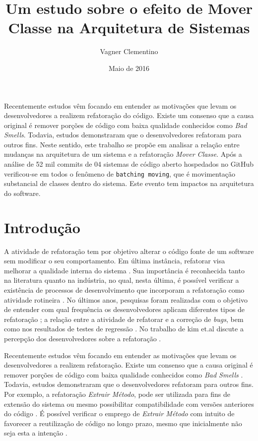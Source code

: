 \documentclass[12pt]{article}
\title{Um estudo sobre o efeito de Mover Classe na Arquitetura de Sistemas}
\author{Vagner Clementino\inst{1}}
\date{Maio de 2016}
\begin{document}
\maketitle

\begin{resumo}
 Recentemente estudos vêm focando em entender as motivações que levam os desenvolvedores a realizem refatoração do código. Existe um consenso que a causa original é remover porções de código com baixa qualidade conhecidos como \textit{Bad Smells}. Todavia, estudos demonstraram que o desenvolvedores refatoram para outros fins. Neste sentido, este trabalho se propõe em analisar a relação entre mudanças na arquitetura de um sistema e a refatoração \textit{Mover Classe}. Após a análise de 52 mil commits de 04 sistemas de código aberto hospedados no GitHub verificou-se em todos o fenômeno de \texttt{batching moving}, que é movimentação substancial de classes dentro do sistema. Este evento tem impactos na arquitetura do software.
\end{resumo}


\section{Introdução}
\label{sec:intro}

A atividade de refatoração tem por objetivo alterar o código fonte de um software sem modificar o seu comportamento. Em última instância, refatorar visa melhorar a qualidade interna do sistema \cite{Fowler1999,Opdyke:1992:ROF:169783}. Sua importância é reconhecida tanto na literatura quanto na indústria, no qual, nesta última, é possível verificar a existência de processos de desenvolvimento que incorporam a refatoração como atividade rotineira \cite{Beck:2000:PEP:557458}. No últimos anos, pesquisas foram realizadas com o objetivo de entender com qual frequência os desenvolvedores aplicam diferentes tipos de refatoração \cite{Murphy-Hill:2009:WRW:1555001.1555044}; a relação entre a atividade de refatorar e a correção de \textit{bugs}\cite{Kim:2011:EIR:1985793.1985815}, bem como nos resultados de testes de regressão  \cite{Kim:2012:EII:2473496.2473590}. No trabalho de kim et.al discute a percepção dos desenvolvedores sobre a refatoração \cite{Kim:2012:FSR:2393596.2393655}.

Recentemente estudos vêm focando em entender as motivações que levam os desenvolvedores a realizem refatoração. Existe um consenso que a causa original é remover porções de código com baixa qualidade conhecidos como \textit{Bad Smells} \cite{Fowler1999}. Todavia, estudos demonstraram que o desenvolvedores refatoram para outros fins. Por exemplo, a refatoração \textit{Extrair Método}, pode ser utilizada para fins de extensão do sistema ou mesmo possibilitar compatibilidade com versões anteriores do código \cite{Tsantalis2013}. É possível verificar o emprego de \textit{Extrair Método} com intuito de favorecer a reutilização de código no longo prazo, mesmo que inicialmente não seja esta a intenção \cite{Danilo}.
\end{document}
